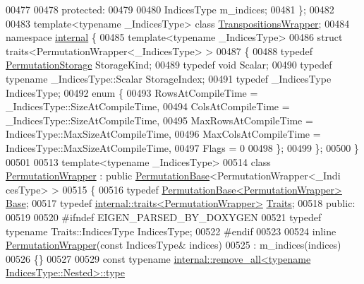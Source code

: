 \begin{DoxyCode}
00477 
00478   \textcolor{keyword}{protected}:
00479 
00480     IndicesType m\_indices;
00481 \};
00482 
00483 \textcolor{keyword}{template}<\textcolor{keyword}{typename} \_IndicesType> \textcolor{keyword}{class }\hyperlink{class_eigen_1_1_transpositions_wrapper}{TranspositionsWrapper};
00484 \textcolor{keyword}{namespace }\hyperlink{namespaceinternal}{internal} \{
00485 \textcolor{keyword}{template}<\textcolor{keyword}{typename} \_IndicesType>
00486 \textcolor{keyword}{struct }traits<PermutationWrapper<\_IndicesType> >
00487 \{
00488   \textcolor{keyword}{typedef} \hyperlink{struct_eigen_1_1_permutation_storage}{PermutationStorage} StorageKind;
00489   \textcolor{keyword}{typedef} \textcolor{keywordtype}{void} Scalar;
00490   \textcolor{keyword}{typedef} \textcolor{keyword}{typename} \_IndicesType::Scalar StorageIndex;
00491   \textcolor{keyword}{typedef} \_IndicesType IndicesType;
00492   \textcolor{keyword}{enum} \{
00493     RowsAtCompileTime = \_IndicesType::SizeAtCompileTime,
00494     ColsAtCompileTime = \_IndicesType::SizeAtCompileTime,
00495     MaxRowsAtCompileTime = IndicesType::MaxSizeAtCompileTime,
00496     MaxColsAtCompileTime = IndicesType::MaxSizeAtCompileTime,
00497     Flags = 0
00498   \};
00499 \};
00500 \}
00501 
00513 \textcolor{keyword}{template}<\textcolor{keyword}{typename} \_IndicesType>
00514 \textcolor{keyword}{class }\hyperlink{group___core___module_class_eigen_1_1_permutation_wrapper}{PermutationWrapper} : \textcolor{keyword}{public} \hyperlink{group___core___module_class_eigen_1_1_permutation_base}{PermutationBase}<PermutationWrapper<\_Indi
      cesType> >
00515 \{
00516     \textcolor{keyword}{typedef} \hyperlink{group___core___module_class_eigen_1_1_permutation_base}{PermutationBase<PermutationWrapper>} 
      \hyperlink{group___core___module_class_eigen_1_1_permutation_base}{Base};
00517     \textcolor{keyword}{typedef} \hyperlink{struct_eigen_1_1internal_1_1traits}{internal::traits<PermutationWrapper>} 
      \hyperlink{struct_eigen_1_1internal_1_1traits}{Traits};
00518   \textcolor{keyword}{public}:
00519 
00520 \textcolor{preprocessor}{    #ifndef EIGEN\_PARSED\_BY\_DOXYGEN}
00521     \textcolor{keyword}{typedef} \textcolor{keyword}{typename} Traits::IndicesType IndicesType;
00522 \textcolor{preprocessor}{    #endif}
00523 
00524     \textcolor{keyword}{inline} \hyperlink{group___core___module_class_eigen_1_1_permutation_wrapper}{PermutationWrapper}(\textcolor{keyword}{const} IndicesType& indices)
00525       : m\_indices(indices)
00526     \{\}
00527 
00529     \textcolor{keyword}{const} \textcolor{keyword}{typename} \hyperlink{group___sparse_core___module}{internal::remove\_all<typename IndicesType::Nested>::type}

\end{DoxyCode}
